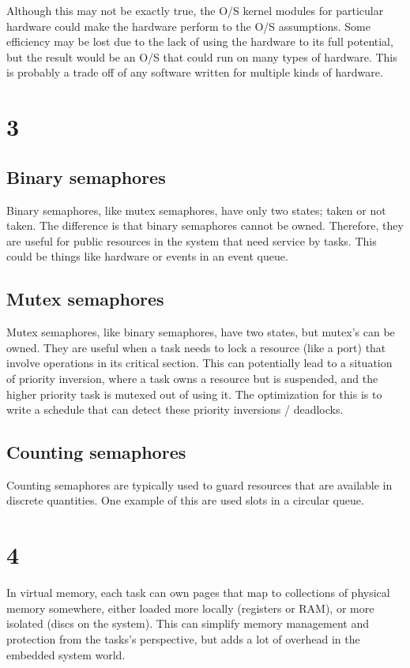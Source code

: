 \documentclass[11pt,letterpaper]{article}
\begin{document}
Although this may not be exactly true, the O/S 
kernel modules for particular hardware could make the hardware perform to the O/S assumptions. Some
efficiency may be lost due to the lack of using the hardware to its full potential, but the result would be an
O/S that could run on many types of hardware. This is probably a trade off of any software written for
multiple kinds of hardware.


\section*{3}
\subsection*{Binary semaphores}
Binary semaphores, like mutex semaphores, have only two states; taken or not taken. The difference is that
binary semaphores cannot be owned. Therefore, they are useful for public resources in the system that 
need service by tasks. This could be things like hardware or events in an event queue.

\subsection*{Mutex semaphores}
Mutex semaphores, like binary semaphores, have two states, but mutex's can be owned. They are useful 
when a task needs to lock a resource (like a port) that involve operations in its critical section. This can 
potentially lead to a situation of priority inversion, where a task owns a resource but is suspended, and the
higher priority task is mutexed out of using it. The optimization for this is to write a schedule that can
detect these priority inversions / deadlocks.

\subsection*{Counting semaphores}
Counting semaphores are typically used to guard resources that are available in discrete quantities. One
example of this are used slots in a circular queue.


\section*{4}
In virtual memory, each task can own pages that map to collections of physical memory somewhere,
either loaded more locally (registers or RAM), or more isolated (discs on the system). This can simplify
memory management and protection from the tasks's perspective, but adds a lot of overhead in the
embedded system world. 
\end{document}
